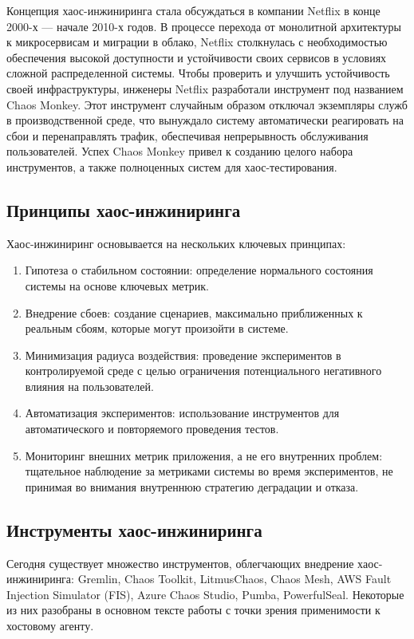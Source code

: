 Концепция хаос-инжиниринга стала обсуждаться в компании Netflix в конце 2000-х — начале 2010-х годов.
В процессе перехода от монолитной архитектуры к микросервисам и миграции в облако, Netflix столкнулась
с необходимостью обеспечения высокой доступности и устойчивости своих сервисов в условиях сложной распределенной системы.
Чтобы проверить и улучшить устойчивость своей инфраструктуры, инженеры Netflix разработали инструмент под названием Chaos Monkey.
Этот инструмент случайным образом отключал экземпляры служб в производственной среде, что вынуждало систему автоматически
реагировать на сбои и перенаправлять трафик, обеспечивая непрерывность обслуживания пользователей.
Успех Chaos Monkey привел к созданию целого набора инструментов, а также полноценных систем для хаос-тестирования.

\subsection{Принципы хаос-инжиниринга}

Хаос-инжиниринг основывается на нескольких ключевых принципах:
\begin{enumerate}
  \item Гипотеза о стабильном состоянии: определение нормального состояния системы на основе ключевых метрик.
  \item Внедрение сбоев: создание сценариев, максимально приближенных к реальным сбоям, которые могут произойти в системе.
  \item Минимизация радиуса воздействия: проведение экспериментов в контролируемой среде с целью ограничения потенциального
  негативного влияния на пользователей.
  \item Автоматизация экспериментов: использование инструментов для автоматического и повторяемого проведения тестов.
  \item Мониторинг внешних метрик приложения, а не его внутренних проблем:
  тщательное наблюдение за метриками системы во время экспериментов, не принимая во внимания внутреннюю стратегию деградации и отказа.
\end{enumerate}

\subsection{Инструменты хаос-инжиниринга}

Сегодня существует множество инструментов, облегчающих внедрение хаос-инжиниринга:
Gremlin, Chaos Toolkit, LitmusChaos, Chaos Mesh, AWS Fault Injection Simulator (FIS),
Azure Chaos Studio, Pumba, PowerfulSeal.
Некоторые из них разобраны в основном тексте работы с точки зрения применимости к хостовому агенту.

